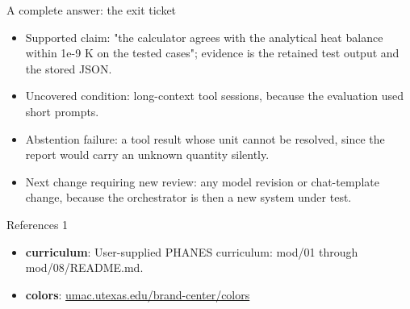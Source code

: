 \documentclass[aspectratio=169,11pt]{beamer}
\begin{document}
\begin{frame}[t,fragile]{A complete answer: the exit ticket}
\fontsize{11.5}{14}\selectfont
\begin{itemize}\setlength{\itemsep}{2mm}
\item Supported claim: "the calculator agrees with the analytical heat balance within 1e-9 K on the tested cases"; evidence is the retained test output and the stored JSON.
\item Uncovered condition: long-context tool sessions, because the evaluation used short prompts.
\item Abstention failure: a tool result whose unit cannot be resolved, since the report would carry an unknown quantity silently.
\item Next change requiring new review: any model revision or chat-template change, because the orchestrator is then a new system under test.
\end{itemize}
\end{frame}
\begin{frame}[t]{References 1}
\fontsize{9}{12}\selectfont\begin{itemize}\setlength{\itemsep}{3mm}
\item \textbf{curriculum}: User-supplied PHANES curriculum: mod/01 through mod/08/README.md.
\item \textbf{colors}: \href{https://umac.utexas.edu/brand-center/colors/}{umac.utexas.edu/brand-center/colors}
\end{itemize}\end{frame}
\end{document}
